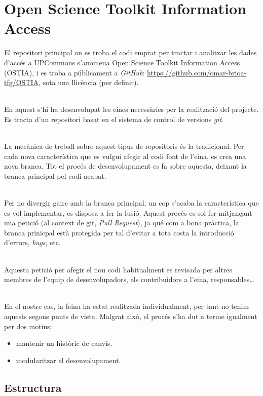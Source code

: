 \chapter{Open Science Toolkit Information Access}\label{ch:ostia}
El repositori principal on es troba el codi emprat per tractar i analitzar les dades d'accés a \gls{UPCommons} s'anomena Open Science Toolkit Information Access (\gls{OSTIA}), i es troba a públicament a \textit{GitHub}: \url{https://github.com/omar-briqa-tfg/OSTIA}, sota una llicència (per definir).

\noindent \\
En aquest s'hi ha desenvolupat les eines necessàries per la realització del projecte.
Es tracta d'un repositori basat en el sistema de control de versions \textit{\gls{git}}.

\noindent \\
La mecànica de treball sobre aquest tipus de repositoris és la tradicional.
Per cada nova característica que es vulgui afegir al codi font de l'eina, es crea una nova branca.
Tot el procés de desenvolupament es fa sobre aquesta, deixant la branca principal pel codi acabat.

\noindent \\
Per no divergir gaire amb la branca principal, un cop s'acaba la característica que es vol implementar, es disposa a fer la fusió.
Aquest procés es sol fer mitjançant una petició (al context de git, \textit{Pull Request}), ja qué com a bona pràctica, la branca prinicpal està protegida per tal d'evitar a tota costa la introducció d'errors, \textit{bugs}, etc.

\noindent \\
Aquesta petició per afegir el nou codi habitualment es revisada per altres membres de l'equip de desenvolupadors, els contribuidors a l'eina, responsables\dots

\noindent \\
En el nostre cas, la feina ha estat realitzada individualment, per tant no tenim aquests segons punts de vista.
Malgrat això, el procés s'ha dut a terme igualment per dos motius:

\begin{itemize}
    \item mantenir un històric de canvis.
    \item modularitzar el desenvolupament.
\end{itemize}{}

\clearpage

\section*{Estructura}\label{sec:ostia-structure}

